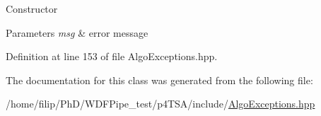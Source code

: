 Constructor


\begin{DoxyParams}{Parameters}
{\em msg} & error message \\
\hline
\end{DoxyParams}


Definition at line 153 of file Algo\+Exceptions.\+hpp.



The documentation for this class was generated from the following file\+:\begin{DoxyCompactItemize}
\item 
/home/filip/\+Ph\+D/\+W\+D\+F\+Pipe\+\_\+test/p4\+T\+S\+A/include/\hyperlink{_algo_exceptions_8hpp}{Algo\+Exceptions.\+hpp}\end{DoxyCompactItemize}
